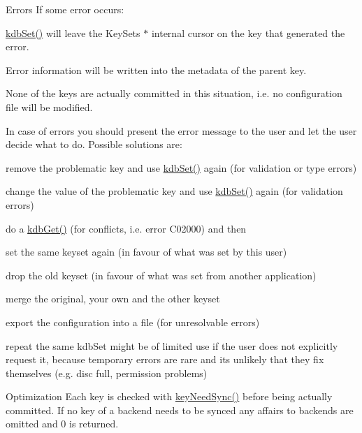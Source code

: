 \begin{DoxyParagraph}{Errors}
If some error occurs\+:
\begin{DoxyItemize}
\item \mbox{\hyperlink{group__kdb_ga11436b058408f83d303ca5e996832bcf}{kdb\+Set()}} will leave the Key\+Set\textquotesingle{}s $\ast$ internal cursor on the key that generated the error.
\item Error information will be written into the metadata of the parent key.
\item None of the keys are actually committed in this situation, i.\+e. no configuration file will be modified.
\end{DoxyItemize}
\end{DoxyParagraph}
In case of errors you should present the error message to the user and let the user decide what to do. Possible solutions are\+:
\begin{DoxyItemize}
\item remove the problematic key and use \mbox{\hyperlink{group__kdb_ga11436b058408f83d303ca5e996832bcf}{kdb\+Set()}} again (for validation or type errors)
\item change the value of the problematic key and use \mbox{\hyperlink{group__kdb_ga11436b058408f83d303ca5e996832bcf}{kdb\+Set()}} again (for validation errors)
\item do a \mbox{\hyperlink{group__kdb_ga28e385fd9cb7ccfe0b2f1ed2f62453a1}{kdb\+Get()}} (for conflicts, i.\+e. error C02000) and then
\begin{DoxyItemize}
\item set the same keyset again (in favour of what was set by this user)
\item drop the old keyset (in favour of what was set from another application)
\item merge the original, your own and the other keyset
\end{DoxyItemize}
\item export the configuration into a file (for unresolvable errors)
\item repeat the same kdb\+Set might be of limited use if the user does not explicitly request it, because temporary errors are rare and its unlikely that they fix themselves (e.\+g. disc full, permission problems)
\end{DoxyItemize}

\begin{DoxyParagraph}{Optimization}
Each key is checked with \mbox{\hyperlink{group__keytest_gaf247df0de7aca04b32ef80e39ef12950}{key\+Need\+Sync()}} before being actually committed. If no key of a backend needs to be synced any affairs to backends are omitted and 0 is returned.
\end{DoxyParagraph}

